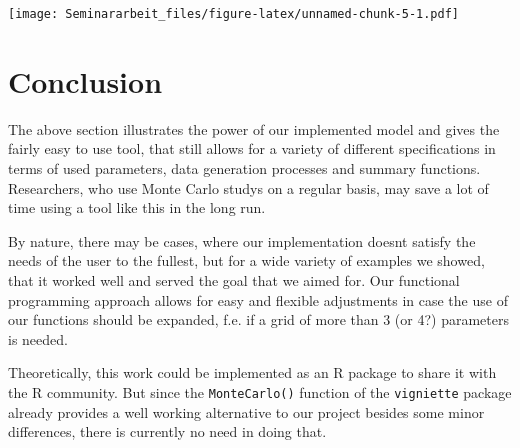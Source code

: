 \documentclass[11pt,a4paper]{article}
\newenvironment{Shaded}{\begin{snugshade}}{\end{snugshade}}
\newcommand{\AttributeTok}[1]{\textcolor[rgb]{0.77,0.63,0.00}{#1}}
\newcommand{\FunctionTok}[1]{\textcolor[rgb]{0.00,0.00,0.00}{#1}}
\newcommand{\NormalTok}[1]{#1}
\newcommand{\OtherTok}[1]{\textcolor[rgb]{0.56,0.35,0.01}{#1}}
\newcommand{\SpecialCharTok}[1]{\textcolor[rgb]{0.00,0.00,0.00}{#1}}
\newcommand{\StringTok}[1]{\textcolor[rgb]{0.31,0.60,0.02}{#1}}
\begin{document}
\begin{Shaded}
\end{Shaded}

\texttt{[image: Seminararbeit\_files/figure-latex/unnamed-chunk-5-1.pdf]}

\hypertarget{conclusion}{%
\section{Conclusion}\label{conclusion}}

The above section illustrates the power of our implemented model and
gives the fairly easy to use tool, that still allows for a variety of
different specifications in terms of used parameters, data generation
processes and summary functions. Researchers, who use Monte Carlo studys
on a regular basis, may save a lot of time using a tool like this in the
long run.

By nature, there may be cases, where our implementation doesnt satisfy
the needs of the user to the fullest, but for a wide variety of examples
we showed, that it worked well and served the goal that we aimed for.
Our functional programming approach allows for easy and flexible
adjustments in case the use of our functions should be expanded, f.e. if
a grid of more than 3 (or 4?) parameters is needed.

Theoretically, this work could be implemented as an R package to share
it with the R community. But since the \texttt{MonteCarlo()} function of
the \texttt{vigniette} package already provides a well working
alternative to our project besides some minor differences, there is
currently no need in doing that.
\end{document}
